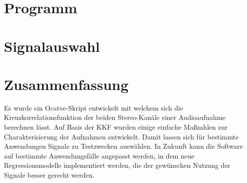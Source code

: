 \section{Programm}


\section{Signalauswahl}


\section{Zusammenfassung}
Es wurde ein Ocatve-Skript entwickelt mit welchem sich die Kreuzkorrelationsfunktion der beiden Stereo-Kanäle einer Audioaufnahme berechnen lässt. Auf Basis der KKF wurden einige einfache Maßzahlen zur Charakterisierung der Aufnahmen entwickelt. Damit lassen sich für bestimmte Anwendungen Signale zu Testzwecken auswählen.
In Zukunft kann die Software auf bestimmte Anwendungsfälle angepasst werden, in dem neue Regressionsmodelle implementiert werden, die der gewünschen Nutzung der Signale besser gerecht werden.
